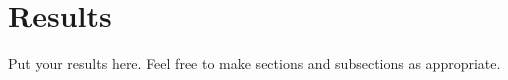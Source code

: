 \chapter{Results} \label{chp:chapter3}

Put your results here. Feel free to make sections and subsections as appropriate.
